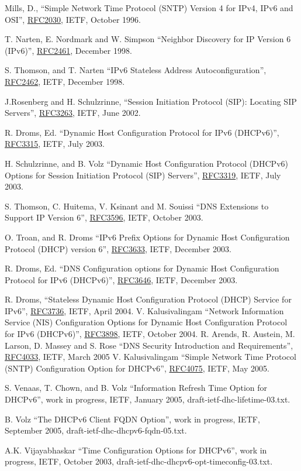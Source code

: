 \newpage

\newcommand{\rfc}[1]{\href{http://tools.ietf.org/html/rfc#1}{RFC#1}}
\begin{thebibliography}{1}

 Mills, D., ``Simple Network Time Protocol (SNTP) Version 4 for
        IPv4, IPv6 and OSI'', \rfc{2030}, IETF, October 1996.

 T. Narten, E. Nordmark and W. Simpson ``Neighbor
	Discovery for IP Version 6 (IPv6)'', \rfc{2461}, December 1998.

 S. Thomson, and T. Narten ``IPv6 Stateless Address
  Autoconfiguration'', \rfc{2462}, IETF, December 1998.

 J.Rosenberg and H. Schulzrinne, ``Session Initiation Protocol
       (SIP): Locating SIP Servers'', \rfc{3263}, IETF, June 2002.

 R. Droms, Ed. ``Dynamic Host Configuration Protocol
  for IPv6 (DHCPv6)'', \rfc{3315}, IETF, July 2003.

 H. Schulzrinne, and B. Volz ``Dynamic Host
  Configuration Protocol (DHCPv6) Options for Session Initiation
  Protocol (SIP) Servers'', \rfc{3319}, IETF, July 2003.

 S. Thomson, C. Huitema, V. Ksinant and M. Souissi
  ``DNS Extensions to Support IP Version 6'', \rfc{3596}, IETF, October
  2003.

 O. Troan, and R. Droms ``IPv6 Prefix Options for
  Dynamic Host Configuration Protocol (DHCP) version 6'', \rfc{3633},
  IETF, December 2003.

 R. Droms, Ed. ``DNS Configuration options for
  Dynamic Host Configuration Protocol for IPv6 (DHCPv6)'', \rfc{3646},
  IETF, December 2003.

 R. Droms, ``Stateless Dynamic Host Configuration
  Protocol (DHCP) Service for IPv6'', \rfc{3736}, IETF, April 2004.
 V. Kalusivalingam ``Network Information Service
  (NIS) Configuration Options for Dynamic Host Configuration Protocol
  for IPv6 (DHCPv6)'', \rfc{3898}, IETF, October 2004.
 R. Arends,  R. Austein, M. Larson, D. Massey and S. Rose
  ``DNS Security Introduction and Requirements'',
  \rfc{4033}, IETF, March 2005
 V. Kalusivalingam ``Simple Network Time Protocol
	(SNTP) Configuration Option for DHCPv6'', \rfc{4075}, IETF, May 2005.

 S. Venaas, T. Chown, and B. Volz
 ``Information Refresh Time Option for DHCPv6'', work in progress,
 IETF, January 2005, draft-ietf-dhc-lifetime-03.txt.

 B. Volz
  ``The DHCPv6 Client FQDN Option'', work in
  progress, IETF, September 2005, draft-ietf-dhc-dhcpv6-fqdn-05.txt.

 A.K. Vijayabhaskar ``Time Configuration Options
	for DHCPv6'', work in progress, IETF, October 2003,
	draft-ietf-dhc-dhcpv6-opt-timeconfig-03.txt.

\end{thebibliography}
